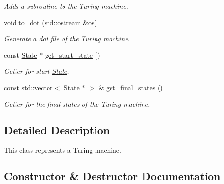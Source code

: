 \begin{DoxyCompactItemize}
\begin{DoxyCompactList}\small\item\em Adds a subroutine to the Turing machine. \end{DoxyCompactList}\item 
void \hyperlink{classTuringMachine_abd6288a60955a8b1b2d0f58d0b3d63da}{to\+\_\+dot} (std\+::ostream \&os)
\begin{DoxyCompactList}\small\item\em Generate a dot file of the Turing machine. \end{DoxyCompactList}\item 
const \hyperlink{classState}{State} $\ast$ \hyperlink{classTuringMachine_a596149a33ff6f9c49100c71977ad16c6}{get\+\_\+start\+\_\+state} ()
\begin{DoxyCompactList}\small\item\em Getter for start \hyperlink{classState}{State}. \end{DoxyCompactList}\item 
const std\+::vector$<$ \hyperlink{classState}{State} $\ast$ $>$ \& \hyperlink{classTuringMachine_ab34c3253e9d158d91a8d2e4473267761}{get\+\_\+final\+\_\+states} ()
\begin{DoxyCompactList}\small\item\em Getter for the final states of the Turing machine. \end{DoxyCompactList}\end{DoxyCompactItemize}


\subsection{Detailed Description}
This class represents a Turing machine. 

\subsection{Constructor \& Destructor Documentation}
\mbox{\label{classTuringMachine_abe6ad3a974d2341a75908b0ab6250410}} 
